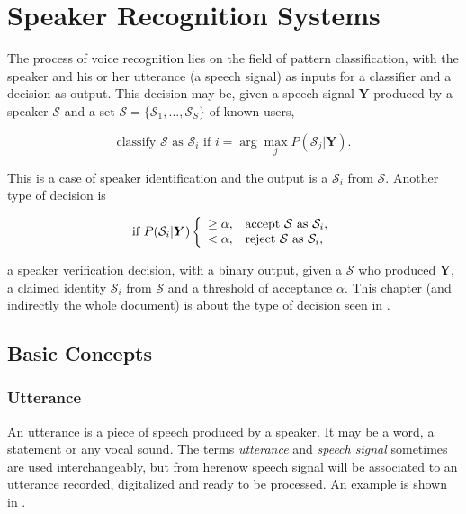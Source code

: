 \chapter{Speaker Recognition Systems}
\label{ch:speaker-recognition-system}

The process of voice recognition lies on the field of pattern classification, with the speaker and his or her utterance (a speech signal) as inputs for a classifier and a decision as output. This decision may be, given a speech signal $\boldsymbol{Y}$ produced by a speaker $\mathcal{S}$ and a set $\boldsymbol{\mathcal{S}} = \{\mathcal{S}_1, ..., \mathcal{S}_S\}$ of known users,

\begin{equation}
    \text{classify } \mathcal{S} \text{ as } \mathcal{S}_i \text{ if } i = \arg\max_j P(\mathcal{S}_j|\boldsymbol{Y}).
    \label{eq:decision_speaker_identification}
\end{equation}

\noindent This is a case of speaker identification and the output is a $\mathcal{S}_i$ from $\boldsymbol{\mathcal{S}}$. Another type of decision is

\begin{equation}
    \text{if } P(\mathcal{S}_i|\boldsymbol{Y}) \verifytestB{\alpha}{\mathcal{S} \text{ as } \mathcal{S}_i}
    \label{eq:decision_speaker_verification}
\end{equation}

\noindent a speaker verification decision, with a binary output, given a $\mathcal{S}$ who produced $\boldsymbol{Y}$, a claimed identity $\mathcal{S}_i$ from $\boldsymbol{\mathcal{S}}$ and a threshold of acceptance $\alpha$. This chapter (and indirectly the whole document) is about the type of decision seen in .

\section{Basic Concepts}

\subsection{Utterance}

An utterance is a piece of speech produced by a speaker. It may be a word, a statement or any vocal sound. The terms \emph{utterance} and \emph{speech signal} sometimes are used interchangeably, but from herenow speech signal will be associated to an utterance recorded, digitalized and ready to be processed. An example is shown in .


